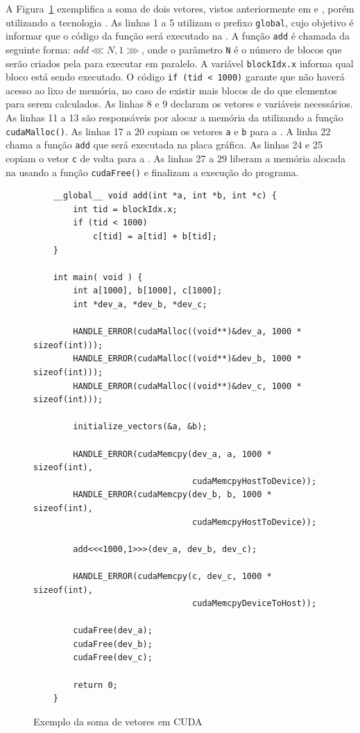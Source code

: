 A Figura~\ref{fig:lstcuda} exemplifica a soma de dois vetores, vistos anteriormente em \openMP e \mpi, porém utilizando a tecnologia \cuda. As linhas 1 a 5 utilizam o prefixo \texttt{global}, cujo objetivo é informar que o código da função será executado na \gpu. A função \texttt{add} é chamada da seguinte forma: \texttt{$add\lll N,1 \ggg$}, onde o parâmetro \texttt{N} é o número de blocos que serão criados pela \gpu para executar em paralelo. A variável \texttt{blockIdx.x} informa qual bloco está sendo executado. O código \texttt{if (tid < 1000)} garante que não haverá acesso ao lixo de memória, no caso de existir mais blocos de \gpu do que elementos para serem calculados. As linhas 8 e 9 declaram os vetores e variáveis necessários. As linhas 11 a 13 são responsáveis por alocar a memória da \gpu utilizando a função \texttt{cudaMalloc()}. As linhas 17 a 20 copiam os vetores \texttt{a} e \texttt{b} para a \gpu. A linha 22 chama a função \texttt{add} que será executada na placa gráfica. As linhas 24 e 25 copiam o vetor \texttt{c} de volta para a \cpu. As linhas 27 a 29 liberam a memória alocada na \gpu usando a função \texttt{cudaFree()} e finalizam a execução do programa.

\begin{figure}[t]
    \centering
    \begin{lstlisting}
    __global__ void add(int *a, int *b, int *c) {
        int tid = blockIdx.x;
        if (tid < 1000)
            c[tid] = a[tid] + b[tid];
    }
    
    int main( void ) {
        int a[1000], b[1000], c[1000];
        int *dev_a, *dev_b, *dev_c;
        
        HANDLE_ERROR(cudaMalloc((void**)&dev_a, 1000 * sizeof(int)));
        HANDLE_ERROR(cudaMalloc((void**)&dev_b, 1000 * sizeof(int)));
        HANDLE_ERROR(cudaMalloc((void**)&dev_c, 1000 * sizeof(int)));
        
        initialize_vectors(&a, &b);
        
        HANDLE_ERROR(cudaMemcpy(dev_a, a, 1000 * sizeof(int),
                                cudaMemcpyHostToDevice));
        HANDLE_ERROR(cudaMemcpy(dev_b, b, 1000 * sizeof(int),
                                cudaMemcpyHostToDevice));
                                
        add<<<1000,1>>>(dev_a, dev_b, dev_c);
        
        HANDLE_ERROR(cudaMemcpy(c, dev_c, 1000 * sizeof(int),
                                cudaMemcpyDeviceToHost));
                                
        cudaFree(dev_a);
        cudaFree(dev_b);
        cudaFree(dev_c);
        
        return 0;
    }
    \end{lstlisting}

    \caption{Exemplo da soma de vetores em CUDA}
    \label{fig:lstcuda}
\end{figure}

